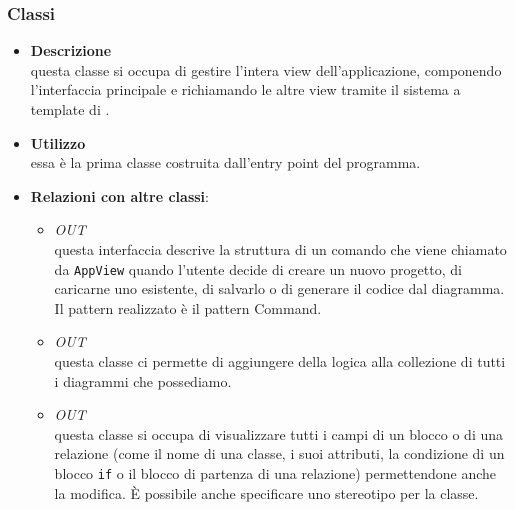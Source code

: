 \subsubsection{Classi}
\label{\nogloxy{swedesigner::client::view::AppView}}
\begin{itemize}
\item \textbf{Descrizione}\\
questa classe si occupa di gestire l'intera view dell'applicazione, componendo l'interfaccia principale e richiamando le altre view tramite il sistema a template di \backbonejs{}.
\item \textbf{Utilizzo}\\
essa è la prima classe costruita dall'entry point del programma.
\item \textbf{Relazioni con altre classi}:
\begin{itemize}
\item \textit{OUT} \hyperref[\nogloxy{swedesigner::client::model::ProjectCommand}]{}\\
questa interfaccia descrive la struttura di un comando che viene chiamato da \texttt{AppView} quando l'utente decide di creare un nuovo progetto, di caricarne uno esistente, di salvarlo o di generare il codice dal diagramma. Il pattern realizzato è il pattern Command.
\item \textit{OUT} \hyperref[\nogloxy{swedesigner::client::model::ProjectModel}]{}\\
questa classe ci permette di aggiungere della logica alla collezione di tutti i diagrammi che possediamo.
\item \textit{OUT} \hyperref[\nogloxy{swedesigner::client::view::DetailsView}]{}\\
questa classe si occupa di visualizzare tutti i campi di un blocco o di una relazione (come il nome di una classe, i suoi attributi, la condizione di un blocco \texttt{if} o il blocco di partenza di una relazione) permettendone anche la modifica. È possibile anche specificare uno stereotipo per la classe.


\end{itemize}
\end{itemize}
